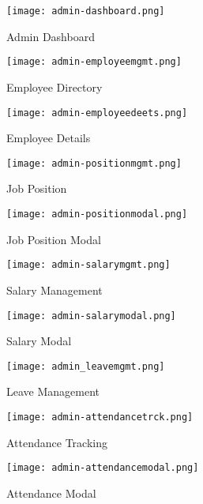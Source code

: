 \documentclass[journal]{./IEEE/IEEEtran}
\begin{document}
\begin{figure}[H]
    \centering
    \texttt{[image: admin-dashboard.png]}
        \caption{Admin Dashboard}
\end{figure}

\begin{figure}[H]
    \centering
    \texttt{[image: admin-employeemgmt.png]}
    \caption{Employee Directory}
\end{figure}



\begin{figure}[H]
    \centering
    \texttt{[image: admin-employeedeets.png]}
    \caption{Employee Details}
\end{figure}

\begin{figure}[H]
    \centering
    \texttt{[image: admin-positionmgmt.png]}
    \caption{Job Position}
\end{figure}

\begin{figure}[H]
    \centering
    \texttt{[image: admin-positionmodal.png]}
    \caption{Job Position Modal}
\end{figure}

\begin{figure}[H]
    \centering
    \texttt{[image: admin-salarymgmt.png]}
    \caption{Salary Management}

\end{figure}


\begin{figure}[H]
    \centering
    \texttt{[image: admin-salarymodal.png]}
    \caption{Salary Modal}

    
\end{figure}

\begin{figure}[H]
    \centering
    \texttt{[image: admin\_leavemgmt.png]}
    \caption{Leave Management}
\end{figure}

\begin{figure}[H]
    \centering
    \texttt{[image: admin-attendancetrck.png]}
    \caption{Attendance Tracking}
\end{figure}
\begin{figure}[H]
    \centering
    \texttt{[image: admin-attendancemodal.png]}
    \caption{Attendance Modal}
\end{figure}
\end{document}
